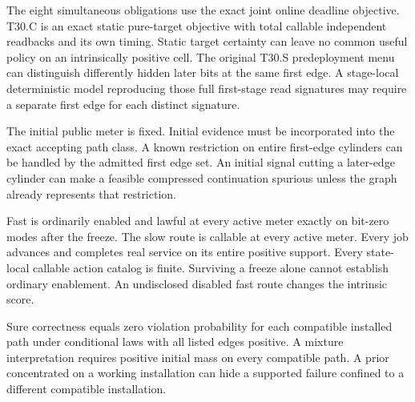 \begin{theorem}
The eight simultaneous obligations use the exact joint online deadline objective. T30.C is an exact static pure-target objective with total callable independent readbacks and its own timing. Static target certainty can leave no common useful policy on an intrinsically positive cell. The original T30.S predeployment menu can distinguish differently hidden later bits at the same first edge. A stage-local deterministic model reproducing those full first-stage read signatures may require a separate first edge for each distinct signature.

The initial public meter is fixed. Initial evidence must be incorporated into the exact accepting path class. A known restriction on entire first-edge cylinders can be handled by the admitted first edge set. An initial signal cutting a later-edge cylinder can make a feasible compressed continuation spurious unless the graph already represents that restriction.

Fast is ordinarily enabled and lawful at every active meter exactly on bit-zero modes after the freeze. The slow route is callable at every active meter. Every job advances and completes real service on its entire positive support. Every state-local callable action catalog is finite. Surviving a freeze alone cannot establish ordinary enablement. An undisclosed disabled fast route changes the intrinsic score.

Sure correctness equals zero violation probability for each compatible installed path under conditional laws with all listed edges positive. A mixture interpretation requires positive initial mass on every compatible path. A prior concentrated on a working installation can hide a supported failure confined to a different compatible installation.

\end{theorem}

